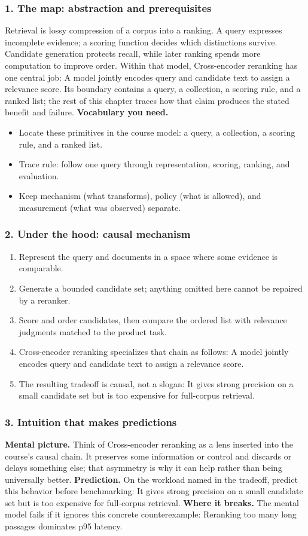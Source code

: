 \subsubsection*{1. The map: abstraction and prerequisites}
Retrieval is lossy compression of a corpus into a ranking. A query expresses incomplete evidence; a scoring function decides which distinctions survive. Candidate generation protects recall, while later ranking spends more computation to improve order.
Within that model, Cross-encoder reranking has one central job: A model jointly encodes query and candidate text to assign a relevance score. Its boundary contains a query, a collection, a scoring rule, and a ranked list; the rest of this chapter traces how that claim produces the stated benefit and failure.
\textbf{Vocabulary you need.}\begin{itemize}
\item Locate these primitives in the course model: a query, a collection, a scoring rule, and a ranked list.
\item Trace rule: follow one query through representation, scoring, ranking, and evaluation.
\item Keep mechanism (what transforms), policy (what is allowed), and measurement (what was observed) separate.
\end{itemize}
\subsubsection*{2. Under the hood: causal mechanism}\begin{enumerate}
\item Represent the query and documents in a space where some evidence is comparable.
\item Generate a bounded candidate set; anything omitted here cannot be repaired by a reranker.
\item Score and order candidates, then compare the ordered list with relevance judgments matched to the product task.
\item Cross-encoder reranking specializes that chain as follows: A model jointly encodes query and candidate text to assign a relevance score.
\item The resulting tradeoff is causal, not a slogan: It gives strong precision on a small candidate set but is too expensive for full-corpus retrieval.
\end{enumerate}
\subsubsection*{3. Intuition that makes predictions}
\textbf{Mental picture.} Think of Cross-encoder reranking as a lens inserted into the course's causal chain. It preserves some information or control and discards or delays something else; that asymmetry is why it can help rather than being universally better.
\textbf{Prediction.} On the workload named in the tradeoff, predict this behavior before benchmarking: It gives strong precision on a small candidate set but is too expensive for full-corpus retrieval.
\textbf{Where it breaks.} The mental model fails if it ignores this concrete counterexample: Reranking too many long passages dominates p95 latency.
